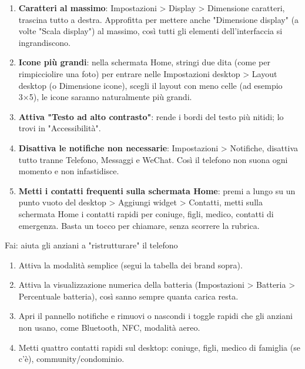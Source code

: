 \begin{enumerate}
  \item \textbf{Caratteri al massimo}: Impostazioni > Display > Dimensione caratteri, trascina tutto a destra. Approfitta per mettere anche "Dimensione display" (a volte "Scala display") al massimo, così tutti gli elementi dell'interfaccia si ingrandiscono.
  \item \textbf{Icone più grandi}: nella schermata Home, stringi due dita (come per rimpicciolire una foto) per entrare nelle Impostazioni desktop > Layout desktop (o Dimensione icone), scegli il layout con meno celle (ad esempio 3×5), le icone saranno naturalmente più grandi.
  \item \textbf{Attiva "Testo ad alto contrasto"}: rende i bordi del testo più nitidi; lo trovi in "Accessibilità".
  \item \textbf{Disattiva le notifiche non necessarie}: Impostazioni > Notifiche, disattiva tutto tranne Telefono, Messaggi e WeChat. Così il telefono non suona ogni momento e non infastidisce.
  \item \textbf{Metti i contatti frequenti sulla schermata Home}: premi a lungo su un punto vuoto del desktop > Aggiungi widget > Contatti, metti sulla schermata Home i contatti rapidi per coniuge, figli, medico, contatti di emergenza. Basta un tocco per chiamare, senza scorrere la rubrica.
\end{enumerate}

\begin{tcbpractice}{Fai: aiuta gli anziani a "ristrutturare" il telefono}
\begin{enumerate}
  \item Attiva la modalità semplice (segui la tabella dei brand sopra).
  \item Attiva la visualizzazione numerica della batteria (Impostazioni > Batteria > Percentuale batteria), così sanno sempre quanta carica resta.
  \item Apri il pannello notifiche e rimuovi o nascondi i toggle rapidi che gli anziani non usano, come Bluetooth, NFC, modalità aereo.
  \item Metti quattro contatti rapidi sul desktop: coniuge, figli, medico di famiglia (se c'è), community/condominio.
\end{enumerate}

\end{tcbpractice}


